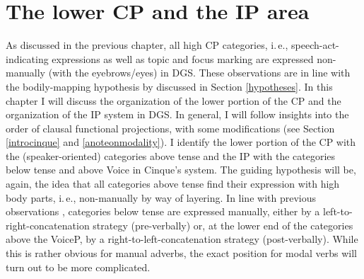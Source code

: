 \chapter{The lower CP and the IP area}\label{ipsystem}
As discussed in the previous chapter, all high CP categories, i.\,e., speech-act-indicating expressions as well as topic and focus marking are expressed non-manually (with the eyebrows/eyes) in DGS. These observations are in line with the bodily-mapping hypothesis by \citet{bross2017scope} discussed in Section \ref{hypotheses}. In this chapter I will discuss the organization of the lower portion of the CP and the organization of the IP system in DGS. In general, I will follow \citet{cinque1999adverbs, cinque2006restructuring} insights into the order of clausal functional projections, with some modifications (see Section \ref{introcinque} and \ref{anoteonmodality}). I identify the lower portion of the CP with the (speaker-oriented) categories above tense and the IP with the categories below tense and above Voice in Cinque's system. The guiding hypothesis will be, again, the idea that all categories above tense find their expression with high body parts, i.\,e., non-manually by way of layering. In line with previous observations \citep{bross2017scope}, categories below tense are expressed manually, either by a left-to-right-concatenation strategy (pre-verbally) or, at the lower end of the categories above the VoiceP, by a right-to-left-concatenation strategy (post-verbally). While this is rather obvious for manual adverbs, the exact position for modal verbs will turn out to be more complicated. 

